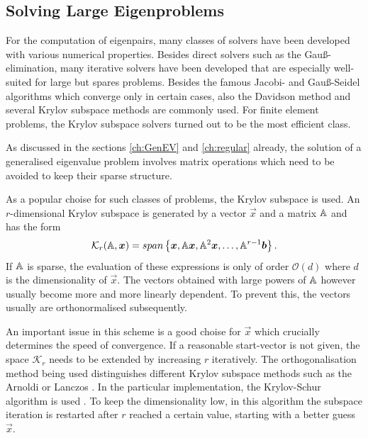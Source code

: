 \subsection{Solving Large Eigenproblems}
\label{ch:ghep}
For the computation of eigenpairs, many classes of solvers have been developed with various numerical properties.
Besides direct solvers such as the Gau\ss-elimination, many iterative solvers have been developed that are especially well-suited for large but spares problems.
Besides the famous Jacobi- and Gau\ss-Seidel algorithms which converge only in certain cases, also the Davidson method and several Krylov subspace methods are commonly used.
For finite element problems, the Krylov subspace solvers turned out to be the most efficient class.

As discussed in the sections \ref{ch:GenEV} and \ref{ch:regular} already, the solution of a generalised eigenvalue problem involves matrix operations which need to be avoided to keep their sparse structure.

As a popular choise for such classes of problems, the Krylov subspace is used.
An $r$-dimensional Krylov subspace is generated by a vector $\vec{x}$ and a matrix $\mathbb{A}$ and has the form
\begin{equation}
   \mathcal{K}_r(\mathbb{A},\bm{x})=span\left\{ \bm{x},\mathbb{A}\bm{x},\mathbb{A}^2\bm{x},\hdots,\mathbb{A}^{r-1}\bm{b} \right\}.
\end{equation}
If $\mathbb{A}$ is sparse, the evaluation of these expressions is only of order $\mathcal{O}(d)$ where $d$ is the dimensionality of $\vec{x}$.
The vectors obtained with large powers of $\mathbb{A}$ however usually become more and more linearly dependent.
To prevent this, the vectors usually are orthonormalised subsequently.

An important issue in this scheme is a good choise for $\vec{x}$ which crucially determines the speed of convergence.
If a reasonable start-vector is not given, the space $\mathcal{K}_r$ needs to be extended by increasing $r$ iteratively.
The orthogonalisation method being used distinguishes different Krylov subspace methods such as the Arnoldi \cite{str-4} or Lanczos \cite{str-5}.
In the particular implementation, the Krylov-Schur algorithm is used \cite{str-7,KrSch}.
To keep the dimensionality low, in this algorithm the subspace iteration is restarted after $r$ reached a certain value, starting with a better guess $\vec{x}$.

